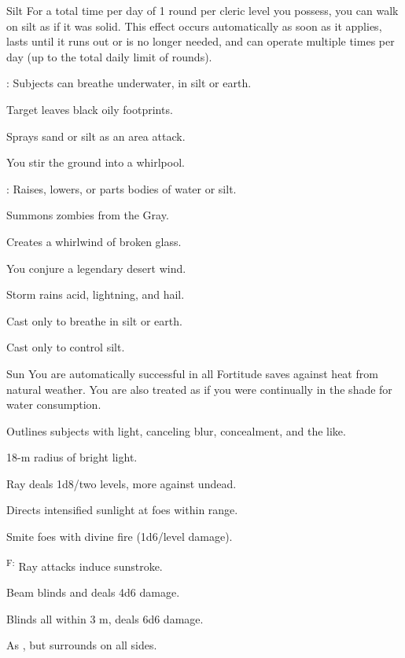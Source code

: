 {Silt}
{For a total time per day of 1 round per cleric level you possess, you can walk on silt as if it was solid. This effect occurs automatically as soon as it applies, lasts until it runs out or is no longer needed, and can operate multiple times per day (up to the total daily limit of rounds).}
{
	\item {}\footnotemark[1]: Subjects can breathe underwater, in silt or earth.
	\item {} Target leaves black oily footprints.
	\item {} Sprays sand or silt as an area attack.
	\item {} You stir the ground into a whirlpool.
	\item {}\footnotemark[2]: Raises, lowers, or parts bodies of water or silt.
	\item {} Summons zombies from the Gray.
	\item {} Creates a whirlwind of broken glass.
	\item {} You conjure a legendary desert wind.
	\item {} Storm rains acid, lightning, and hail.
}
 Cast only to breathe in silt or earth.

 Cast only to control silt.

{Sun}
{You are automatically successful in all Fortitude saves against heat from natural weather. You are also treated as if you were continually in the shade for water consumption.}
{
	\item {} Outlines subjects with light, canceling blur, concealment, and the like.
	\item {} 18-m radius of bright light.
	\item {} Ray deals 1d8/two levels, more against undead.
	\item {} Directs intensified sunlight at foes within range.
	\item {} Smite foes with divine fire (1d6/level damage).
	\item {}\textsuperscript{F:} Ray attacks induce sunstroke.
	\item {} Beam blinds and deals 4d6 damage.
	\item {} Blinds all within 3 m, deals 6d6 damage.
	\item {} As , but surrounds on all sides.
}

